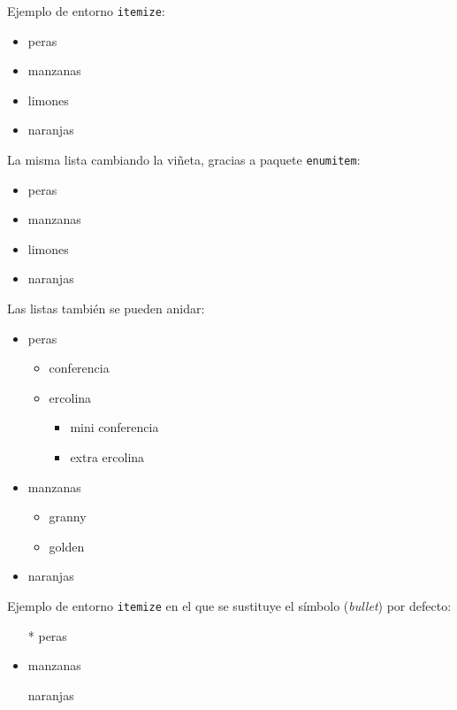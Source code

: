 \documentclass[ 		%
	11pt,				%
	a4paper,			%
	twoside,			%
	openright,			%
	final       		%
]{book}
\begin{document}
\noindent Ejemplo de entorno {\tt itemize}:

\begin{itemize}
	\item peras
	\item manzanas
    \item 	limones
    \item 	naranjas
\end{itemize}

\noindent La misma lista cambiando la viñeta, gracias a paquete \texttt{enumitem}:
\begin{itemize}[]
	\item peras
	\item manzanas
	\item limones
	\item naranjas
\end{itemize}


Las listas también se pueden anidar:
\begin{itemize}
	\item peras
	\begin{itemize}
		\item conferencia
		\item ercolina
    	\begin{itemize}
    		\item mini conferencia
    		\item extra ercolina
    	\end{itemize}
	\end{itemize}
	\item manzanas
	\begin{itemize}
		\item granny
		\item golden 
	\end{itemize}
	\item naranjas
\end{itemize}


\noindent Ejemplo de entorno {\tt itemize} en el que se sustituye el símbolo (\emph{bullet}) por defecto:

\begin{itemize}
	\item[*] peras
	\item manzanas
	\item[\ding{170}] naranjas
\end{itemize}
\end{document}
